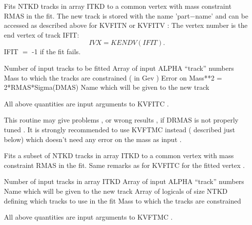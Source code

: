 \noindent{}
\par
\noindent Fits NTKD tracks in array ITKD to a common vertex with mass
constraint RMAS in the fit. The new track is stored with the name 'part$-$name'
and can be accessed as described above for KVFITN or KVFITV :
The vertex number is the end vertex of track IFIT:
$$IVX = KENDV(IFIT).$$
IFIT $=$ -1 if the fit fails.
\par
\par
\begin{indentlist}{ 3.25cm}{ 3.50cm}
Number of input tracks to be fitted
Array of input ALPHA ``track'' numbers
Mass to which the tracks are constrained  ( in Gev )
Error on Mass**2 = 2*RMAS*Sigma(DMAS)
Name which will be given to the new track
\end{indentlist}
\par
All above quantities are input arguments to KVFITC .
\par
This routine may give problems , or wrong results ,
if DRMAS is not properly tuned . It is strongly recommended to use
KVFTMC instead ( described just below) which doesn't need any error on the mass as input .
\par
\noindent{}
\par
\noindent Fits a subset of NTKD tracks in array ITKD to a common vertex with mass
constraint RMAS in the fit. Same remarks as for KVFITC for the fitted vertex .
\par
\par
\begin{indentlist}{ 3.25cm}{ 3.50cm}
Number of input tracks in array ITKD
Array of input ALPHA ``track'' numbers
Name which will be given to the new track
Array of logicals of size NTKD defining which tracks to use in the fit
Mass to which the tracks are constrained
\end{indentlist}
\par
All above quantities are input arguments to KVFTMC .
\par
